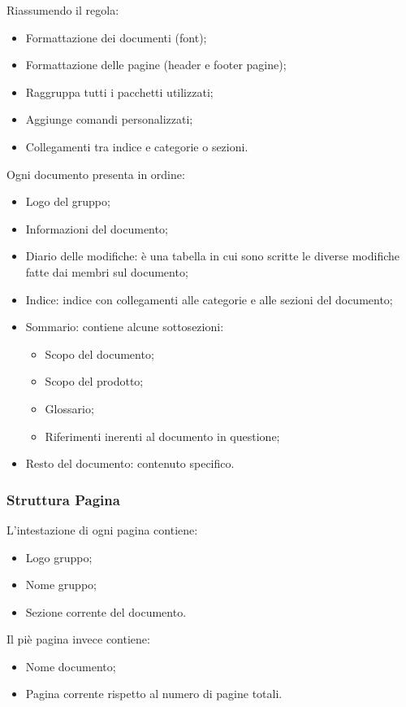 \documentclass{scalatekids-article}
\begin{document}
Riassumendo il  regola:
\begin{itemize}
\item Formattazione dei documenti (font);
\item Formattazione delle pagine (header e footer pagine);
\item Raggruppa tutti i pacchetti utilizzati;
\item Aggiunge comandi personalizzati;
\item Collegamenti tra indice e categorie o sezioni.
\end{itemize}
Ogni documento presenta in ordine:
\begin{itemize}
\item Logo del gruppo;
\item Informazioni del documento;
\item Diario delle modifiche: è una tabella in cui sono scritte le diverse modifiche fatte dai membri sul documento;
\item Indice: indice con collegamenti alle categorie e alle sezioni del documento;
\item Sommario: contiene alcune sottosezioni:
  \begin{itemize}
  \item Scopo del documento;
  \item Scopo del prodotto;
  \item Glossario;
  \item Riferimenti inerenti al documento in questione;
  \end{itemize}
\item Resto del documento: contenuto specifico.
\end{itemize}

\subsubsection{Struttura Pagina}
L'intestazione di ogni pagina contiene:
\begin{itemize}
\item Logo gruppo;
\item Nome gruppo;
\item Sezione corrente del documento.
\end{itemize}
Il piè pagina invece contiene:
\begin{itemize}
\item Nome documento;
\item Pagina corrente rispetto al numero di pagine totali.
\end{itemize}
\end{document}
